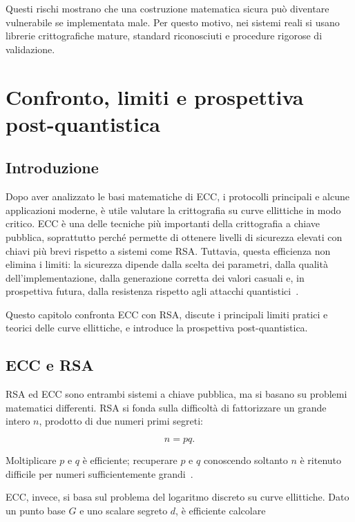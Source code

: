 \documentclass[12pt,a4paper,oneside]{report}
\begin{document}
Questi rischi mostrano che una costruzione matematica sicura può diventare vulnerabile se implementata male. Per questo motivo, nei sistemi reali si usano librerie crittografiche mature, standard riconosciuti e procedure rigorose di validazione.

\chapter{Confronto, limiti e prospettiva post-quantistica}

\section{Introduzione}

Dopo aver analizzato le basi matematiche di ECC, i protocolli principali e alcune applicazioni moderne, è utile valutare la crittografia su curve ellittiche in modo critico. ECC è una delle tecniche più importanti della crittografia a chiave pubblica, soprattutto perché permette di ottenere livelli di sicurezza elevati con chiavi più brevi rispetto a sistemi come RSA. Tuttavia, questa efficienza non elimina i limiti: la sicurezza dipende dalla scelta dei parametri, dalla qualità dell'implementazione, dalla generazione corretta dei valori casuali e, in prospettiva futura, dalla resistenza rispetto agli attacchi quantistici~\cite{margara_ec,nist_sp800_57,sec1}.

Questo capitolo confronta ECC con RSA, discute i principali limiti pratici e teorici delle curve ellittiche, e introduce la prospettiva post-quantistica.

\section{ECC e RSA}

RSA ed ECC sono entrambi sistemi a chiave pubblica, ma si basano su problemi matematici differenti. RSA si fonda sulla difficoltà di fattorizzare un grande intero \(n\), prodotto di due numeri primi segreti:

\[
n=pq.
\]

Moltiplicare \(p\) e \(q\) è efficiente; recuperare \(p\) e \(q\) conoscendo soltanto \(n\) è ritenuto difficile per numeri sufficientemente grandi~\cite{margara_rsa}.

ECC, invece, si basa sul problema del logaritmo discreto su curve ellittiche. Dato un punto base \(G\) e uno scalare segreto \(d\), è efficiente calcolare
\end{document}

